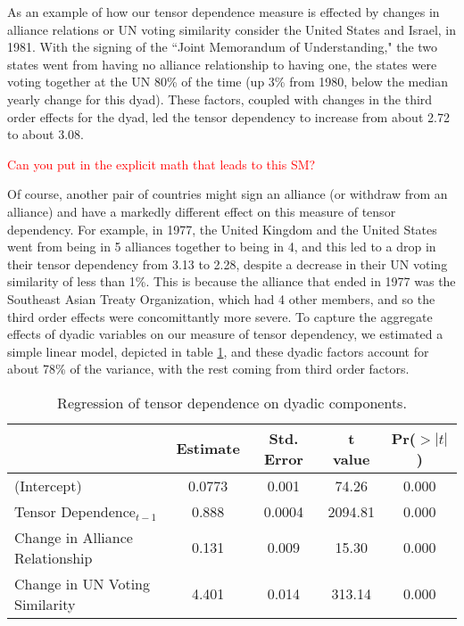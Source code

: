 As an example of how our tensor dependence measure is effected by changes in alliance relations or UN voting similarity consider the United States and Israel, in 1981. With the signing of the ``Joint Memorandum of Understanding," the two states went from having no alliance relationship to having one, the states were voting together at the UN 80\% of the time (up 3\% from 1980, below the median yearly change for this dyad). These factors, coupled with changes in the third order effects for the dyad, led the tensor dependency to increase from about 2.72 to about 3.08. 

\textcolor{red}{Can you put in the explicit math that leads to this SM?} 

Of course, another pair of countries might sign an alliance (or withdraw from an alliance) and have a markedly different effect on this measure of tensor dependency. For example, in 1977, the United Kingdom and the United States went from being in 5 alliances together to being in 4, and this led to a drop in their tensor dependency from 3.13 to 2.28, despite a decrease in their UN voting similarity of less than 1\%. This is because the alliance that ended in 1977 was the Southeast Asian Treaty Organization, which had 4 other members, and so the third order effects were concomittantly more severe. To capture the aggregate effects of dyadic variables on our measure of tensor dependency, we estimated a simple linear model, depicted in table \ref{tensor:ols}, and these dyadic factors account for about 78\% of the variance, with the rest coming from third order factors. 

\begin{table}[ht]
	\centering
	\begin{tabular}{lcccc}
		\hline
		& Estimate & Std. Error & t value & Pr($>|t|$) \\ 
		\hline
		(Intercept) & 0.0773 & 0.001 & 74.26 & 0.000 \\ 
		Tensor Dependence$_{t-1}$ & 0.888 & 0.0004 & 2094.81 & 0.000 \\ 
		Change in Alliance Relationship & 0.131 & 0.009 & 15.30 & 0.000 \\ 
		Change in UN Voting Similarity & 4.401 & 0.014 & 313.14 & 0.000 \\ 
		\hline
	\end{tabular}
	\label{tensor:ols}
	\caption{Regression of tensor dependence on dyadic components.}
\end{table}


